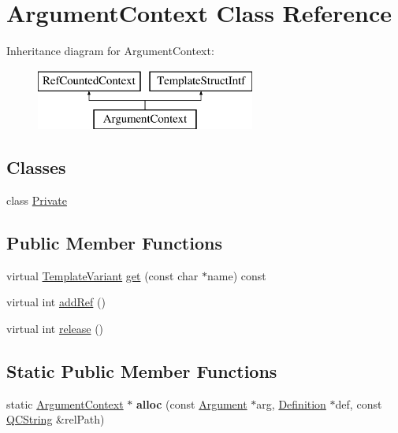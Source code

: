 \hypertarget{class_argument_context}{}\section{Argument\+Context Class Reference}
\label{class_argument_context}
Inheritance diagram for Argument\+Context\+:\begin{figure}[H]
\begin{center}
\leavevmode
\includegraphics[height=2.000000cm]{class_argument_context}
\end{center}
\end{figure}
\subsection*{Classes}
\begin{DoxyCompactItemize}
\item 
class \mbox{\hyperlink{class_argument_context_1_1_private}{Private}}
\end{DoxyCompactItemize}
\subsection*{Public Member Functions}
\begin{DoxyCompactItemize}
\item 
virtual \mbox{\hyperlink{class_template_variant}{Template\+Variant}} \mbox{\hyperlink{class_argument_context_a3114bb03f4b465f3b308d6157c393d22}{get}} (const char $\ast$name) const
\item 
virtual int \mbox{\hyperlink{class_argument_context_ac494f4b56f0a590273034856f4e22728}{add\+Ref}} ()
\item 
virtual int \mbox{\hyperlink{class_argument_context_a4233e98a25aa25c9356b5584f2e338d6}{release}} ()
\end{DoxyCompactItemize}
\subsection*{Static Public Member Functions}
\begin{DoxyCompactItemize}
\item 
\mbox{\label{class_argument_context_ad007d7e5e54f16df19d03ec389077b9d}} 
static \mbox{\hyperlink{class_argument_context}{Argument\+Context}} $\ast$ {\bfseries alloc} (const \mbox{\hyperlink{struct_argument}{Argument}} $\ast$arg, \mbox{\hyperlink{class_definition}{Definition}} $\ast$def, const \mbox{\hyperlink{class_q_c_string}{Q\+C\+String}} \&rel\+Path)
\end{DoxyCompactItemize}


